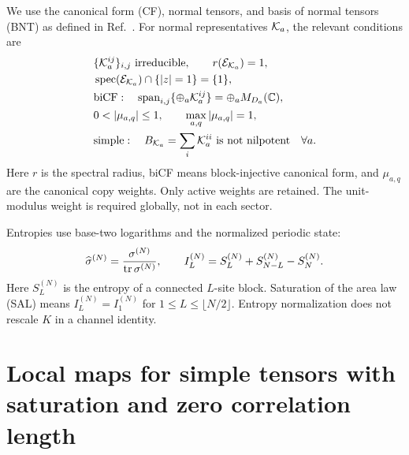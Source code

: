 \documentclass[aps,pra,reprint,nofootinbib,onecolumn]{revtex4-2}
\begin{document}
We use the canonical form (CF), normal tensors, and basis
of normal tensors (BNT) as defined in Ref.~\cite{Cirac2017MPDO_AnnPhys}.
For normal representatives $\mathcal{K}_a$, the relevant conditions are
\begin{align}
	 & \{\mc K_a^{ij}\}_{i,j}\text{ irreducible},\qquad
	r(\mc E_{\mc K_a})=1,\nonumber                                       \\
	 & \operatorname{spec}(\mc E_{\mc K_a})\cap\{|z|=1\}=\{1\},\nonumber \\
	 & \text{biCF}:\quad
	\operatorname{span}_{i,j}\{\oplus_a\mc K_a^{ij}\}
	=\oplus_a M_{D_a}(\mathbb C),\nonumber                               \\
	 & 0<|\mu_{a,q}|\leq1,\qquad \max_{a,q}|\mu_{a,q}|=1,\nonumber       \\
	 & \text{simple}:\quad
	B_{\mc K_a}=\sum_i\mc K_a^{ii}\text{ is not nilpotent}
	\quad\forall a.
	\label{eq:canonical-conditions}
\end{align}
Here $r$ is the spectral radius, biCF means block-injective
canonical form, and $\mu_{a,q}$ are the canonical copy weights.
Only active weights are retained. The unit-modulus weight is
required globally, not in each sector.

Entropies use base-two logarithms and the normalized periodic state:
\begin{align}
	\widehat\sigma^{(N)}=\frac{\sigma^{(N)}}{\operatorname{tr}\sigma^{(N)}},
	\qquad
	I_L^{(N)}=S_L^{(N)}+S_{N-L}^{(N)}-S_N^{(N)}.
	\label{eq:entropy-sal-def}
\end{align}
Here $S_L^{(N)}$ is the entropy of a connected $L$-site block.
Saturation of the area law (SAL) means
$I_L^{(N)}=I_1^{(N)}$ for $1\leq L\leq\lfloor N/2\rfloor$.
Entropy normalization does not rescale $K$ in a channel identity.

\section{Local maps for simple tensors with saturation and zero correlation length}\label{sec:blocking}
\end{document}

